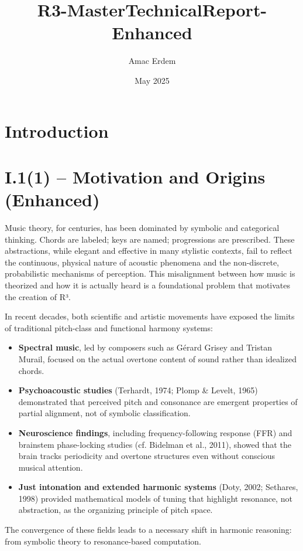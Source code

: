 \documentclass{article}
\title{R3-MasterTechnicalReport-Enhanced}
\author{Amac Erdem}
\date{May 2025}
\begin{document}
\maketitle

\section{Introduction}
\section*{I.1(1) – Motivation and Origins (Enhanced)}

Music theory, for centuries, has been dominated by symbolic and categorical thinking. Chords are labeled; keys are named; progressions are prescribed. These abstractions, while elegant and effective in many stylistic contexts, fail to reflect the continuous, physical nature of acoustic phenomena and the non-discrete, probabilistic mechanisms of perception. This misalignment between how music is theorized and how it is actually heard is a foundational problem that motivates the creation of R³.

In recent decades, both scientific and artistic movements have exposed the limits of traditional pitch-class and functional harmony systems:

\begin{itemize}
    \item \textbf{Spectral music}, led by composers such as Gérard Grisey and Tristan Murail, focused on the actual overtone content of sound rather than idealized chords.
    \item \textbf{Psychoacoustic studies} (Terhardt, 1974; Plomp \& Levelt, 1965) demonstrated that perceived pitch and consonance are emergent properties of partial alignment, not of symbolic classification.
    \item \textbf{Neuroscience findings}, including frequency-following response (FFR) and brainstem phase-locking studies (cf. Bidelman et al., 2011), showed that the brain tracks periodicity and overtone structures even without conscious musical attention.
    \item \textbf{Just intonation and extended harmonic systems} (Doty, 2002; Sethares, 1998) provided mathematical models of tuning that highlight resonance, not abstraction, as the organizing principle of pitch space.
\end{itemize}

The convergence of these fields leads to a necessary shift in harmonic reasoning: from symbolic theory to resonance-based computation.
\end{document}
